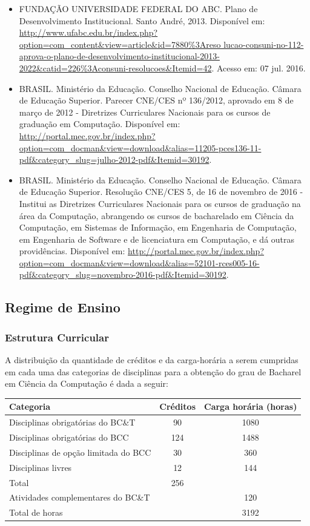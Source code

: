 \documentclass{article}
\begin{document}
\begin{itemize}
\item FUNDAÇÃO UNIVERSIDADE FEDERAL DO ABC. Plano de Desenvolvimento
Institucional. Santo André, 2013. Disponível em: \url{http://www.ufabc.edu.br/index.php?option=com_content&view=article&id=7880%
lucao-consuni-no-112-aprova-o-plano-de-desenvolvimento-institucional-2013-
2022&catid=226%

\item BRASIL. Ministério da Educação. Conselho Nacional de Educação. Câmara de Educação Superior. Parecer CNE/CES nº 136/2012, aprovado em 8 de março de
2012 - Diretrizes Curriculares Nacionais para os cursos de graduação em Computação. Disponível em: \url{http://portal.mec.gov.br/index.php?option=com_docman&view=download&alias=11205-pces136-11-pdf&category_slug=julho-2012-pdf&Itemid=30192}.

\item BRASIL. Ministério da Educação. Conselho Nacional de Educação. Câmara de Educação Superior. Resolução CNE/CES 5, de 16 de novembro de 2016 - Institui as Diretrizes Curriculares Nacionais para os cursos de graduação na área da Computação, abrangendo os cursos de bacharelado em Ciência da Computação, em Sistemas de Informação, em Engenharia de Computação, em Engenharia de Software e de licenciatura em Computação, e dá outras providências. Disponível em: \url{http://portal.mec.gov.br/index.php?option=com_docman&view=download&alias=52101-rces005-16-pdf&category_slug=novembro-2016-pdf&Itemid=30192}.

\end{itemize}


\subsection{Regime de Ensino}

\subsubsection{Estrutura Curricular}
A distribuição da quantidade de créditos e da carga-horária a serem cumpridas em cada uma das categorias de disciplinas para a obtenção do grau de Bacharel em Ciência da Computação é dada a seguir:

\begin{center}
\begin{tabular}{|l|c|c|}
\hline
Categoria & Créditos & Carga horária (horas)\\
\hline\hline
Disciplinas obrigatórias do BC\&T & 90 & 1080\\
\hline
Disciplinas obrigatórias do BCC & 124 & 1488 \\
\hline
Disciplinas de opção limitada do BCC & 30 & 360 \\
\hline
Disciplinas livres & 12 & 144\\
\hline
Total & 256 & \\
\hline\hline
Atividades complementares do BC\&T & & 120\\
\hline
Total de horas & & 3192\\
\hline
\end{tabular}
\end{center}
\end{document}
